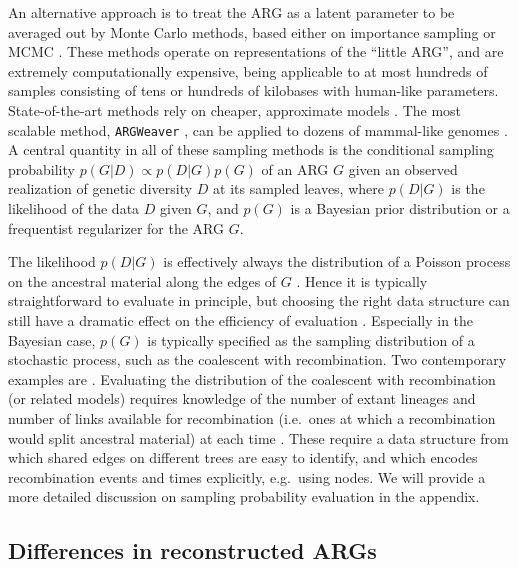 \documentclass{article}
\begin{document}
An alternative approach is to treat the ARG as a latent parameter to be averaged out
by Monte Carlo methods, based either on importance sampling
\citep{griffiths1996ancestral, fearnhead2001estimating, jenkins2011inference}
or MCMC \citep{kuhner2000maximum, nielsen2000estimation, wang2008bayesian, fallon2013acg, mahmoudi2022bayesian}.
These methods operate on representations of the ``little ARG'', and are extremely computationally
expensive, being applicable to at most hundreds of samples consisting of tens or hundreds of kilobases with
human-like parameters. State-of-the-art methods rely on cheaper, approximate models
\citep{didelot2010inference, heine2018bridging, hubisz2020mapping,hubisz2020inference, medina2020speeding}.
The most scalable method, \texttt{ARGWeaver} \citep{rasmussen2014genome}, can be applied to dozens of mammal-like
genomes \citep{hubisz2020inference}.
A central quantity in all of these sampling methods is the conditional sampling probability
$p(G | D) \propto p(D | G) p(G)$ of an ARG $G$ given an observed realization
of genetic diversity $D$ at its sampled leaves, where $p(D | G)$ is the likelihood
of the data $D$ given $G$, and $p(G)$ is a Bayesian prior distribution or a
frequentist regularizer for the ARG $G$.

The likelihood $p(D | G)$ is effectively always the distribution of
a Poisson process on the ancestral material along the edges of $G$ \citep[Eq.\ (2)]{mahmoudi2022bayesian}.
Hence it is typically straightforward to evaluate in principle, but choosing the
right data structure can still have a dramatic effect on the efficiency of evaluation
\citep{mahmoudi2022bayesian}. Especially in the Bayesian case, $p(G)$ is typically specified
as the sampling distribution of a stochastic process, such as the coalescent with
recombination. Two contemporary examples are
\cite{mahmoudi2022bayesian, guo2022recombination}.
Evaluating the distribution of the coalescent with recombination
(or related models) requires knowledge of the number of extant lineages and
number of links available for recombination (i.e.\ ones at which a recombination
would split ancestral material) at each time \citep[Eq.\ (3)]{mahmoudi2022bayesian}.
These require a data structure from which shared edges on different trees are easy to identify,
and which encodes recombination events and times explicitly, e.g.\ using nodes.
We will provide a more detailed discussion on sampling probability evaluation in the appendix.

\subsection*{Differences in reconstructed ARGs}
\end{document}
